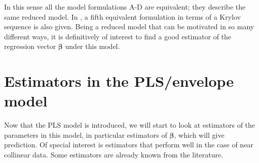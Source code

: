\documentclass[a4paper, 11pt]{article}
\begin{document}
\bigskip

In this sense all the model formulations A-D are equivalent; they describe the same reduced model. In \citet{cook2013envelopes}, a fifth equivalent formulation in terms
of a Krylov sequence is also given. Being a reduced model that can be motivated in so many different ways, it is definitively of interest to find a good estimator of the regression vector $\bm{\beta}$ under this model.





\section{Estimators in the PLS/envelope model}

Now that the PLS model is introduced, we will start to look at estimators of the parameters in this model, in particular estimators of $\bm{\beta}$, which will give prediction. Of special interest is estimators that perform well in the case of near collinear data. Some estimators are already known from the literature.
\end{document}
